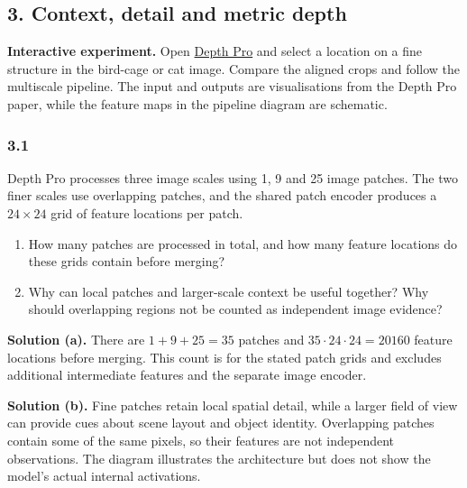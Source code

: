 \documentclass[11pt,a4paper]{article}
\newcommand{\laburl}{https://sosekie.github.io/Unibe-CVG-CV-Interactive-Labs/tutorial-11/}
\newcommand{\lablink}[2]{\href{\laburl\##1}{#2}}
\begin{document}
\subsection*{3. Context, detail and metric depth}
\noindent\textbf{Interactive experiment.}
Open \lablink{detail}{Depth Pro} and select a location on a fine structure in the bird-cage or cat image.
Compare the aligned crops and follow the multiscale pipeline.
The input and outputs are visualisations from the Depth Pro paper, while the feature maps in the pipeline diagram are schematic.
\par\noindent
\begin{minipage}{\linewidth}
\subsubsection*{3.1}
Depth Pro processes three image scales using 1, 9 and 25 image patches.
The two finer scales use overlapping patches, and the shared patch encoder produces a $24\times24$ grid of feature locations per patch.
\begin{enumerate}[label=(\alph*),nosep]
\item How many patches are processed in total, and how many feature locations do these grids contain before merging?
\item Why can local patches and larger-scale context be useful together?
Why should overlapping regions not be counted as independent image evidence?
\end{enumerate}
\ifsolutions
\noindent\textbf{Solution (a).}
There are $1+9+25=35$ patches and $35\cdot24\cdot24=20160$ feature locations before merging.
This count is for the stated patch grids and excludes additional intermediate features and the separate image encoder.

\noindent\textbf{Solution (b).}
Fine patches retain local spatial detail, while a larger field of view can provide cues about scene layout and object identity.
Overlapping patches contain some of the same pixels, so their features are not independent observations.
The diagram illustrates the architecture but does not show the model's actual internal activations.
\fi
\end{minipage}
\par\medskip
\par\noindent
\end{document}
